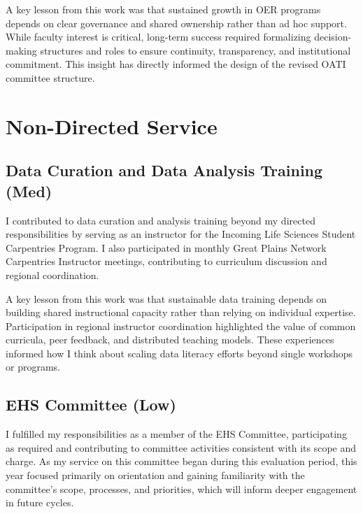 \vspace{\baselineskip}

A key lesson from this work was that sustained growth in OER programs depends on clear governance and shared ownership rather than ad hoc support. While faculty interest is critical, long-term success required formalizing decision-making structures and roles to ensure continuity, transparency, and institutional commitment. This insight has directly informed the design of the revised OATI committee structure.



\section{Non-Directed Service}

\subsection*{Data Curation and Data Analysis Training (Med)}

I contributed to data curation and analysis training beyond my directed responsibilities by serving as an instructor for the Incoming Life Sciences Student Carpentries Program. I also participated in monthly Great Plains Network Carpentries Instructor meetings, contributing to curriculum discussion and regional coordination.

\vspace{\baselineskip}

A key lesson from this work was that sustainable data training depends on building shared instructional capacity rather than relying on individual expertise. Participation in regional instructor coordination highlighted the value of common curricula, peer feedback, and distributed teaching models. These experiences informed how I think about scaling data literacy efforts beyond single workshops or programs.


\vspace{\baselineskip}

\subsection*{EHS Committee (Low)}

I fulfilled my responsibilities as a member of the EHS Committee, participating as required and contributing to committee activities consistent with its scope and charge. As my service on this committee began during this evaluation period, this year focused primarily on orientation and gaining familiarity with the committee’s scope, processes, and priorities, which will inform deeper engagement in future cycles.


